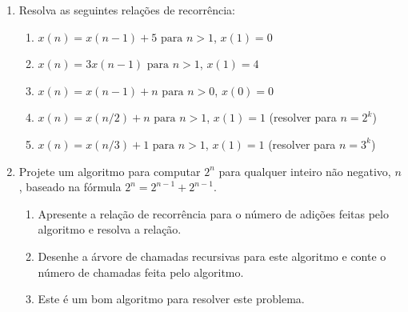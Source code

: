 \documentclass[9pt,a4paper]{extarticle}
\begin{document}
\begin{enumerate}[resume]
\begin{enumerate}
        \textit{Sugestão: para cada valor de $i$, conte quantos valores de $j$ são considerados e some sobre $i$. Use a identidade $\sum_{i=1}^{n-1} (n - i) = \dfrac{n(n-1)}{2}$.}

        \item Construa a tabela de custos no estilo CLRS para o pior caso e escreva $T_{\text{pior}}(n)$ como soma dos termos $c_i$ ponderados por suas frequências.
        \item Mostre que $T_{\text{pior}}(n) = \Theta(n^2)$, exibindo as constantes da definição assintótica.
        \item Descreva o \textbf{melhor caso} do algoritmo: quantas execuções da linha 3 ocorrem? Qual é a classe assintótica de $T_{\text{melhor}}(n)$?
        \item Compare a classe assintótica deste algoritmo com a do \textsc{Insertion-Sort} no pior caso.
    \end{enumerate}

    \item Resolva as seguintes relações de recorrência:
    \begin{enumerate}
        \item $x(n) = x(n-1) + 5 \text{ para } n>1$, $x(1)=0$
        \item $x(n) = 3x(n-1)\text{ para } n>1$, $x(1)=4$
        \item $x(n) = x(n-1) + n \text{ para } n>0$, $x(0)=0$
        \item $x(n) = x(n/2) + n \text{ para } n>1$, $x(1)=1$ (resolver para $n = 2^k$)
        \item $x(n) = x(n/3) + 1 \text{ para } n>1$, $x(1)=1$ (resolver para $n = 3^k$)
    \end{enumerate}
    
    
    \item Projete um algoritmo para computar $2^n$ para qualquer inteiro não negativo, $n$, baseado na fórmula $2^n = 2^{n-1} + 2^{n-1}$.
    \begin{enumerate}
        \item Apresente a relação de recorrência para o número de adições feitas pelo algoritmo e resolva a relação.
        \item Desenhe a árvore de chamadas recursivas  para este algoritmo e conte o número de chamadas feita pelo algoritmo.
        \item Este é um bom algoritmo para resolver este problema.
    \end{enumerate}


\end{enumerate}
\end{document}
